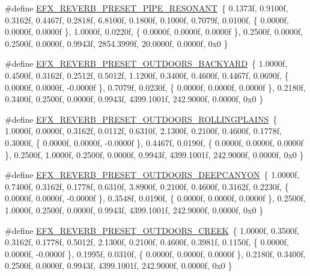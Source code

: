 \begin{DoxyCompactItemize}
\item 
\#define \hyperlink{efx-presets_8h_af6bed932704e2dc1a1631fdd6393a1c5}{E\+F\+X\+\_\+\+R\+E\+V\+E\+R\+B\+\_\+\+P\+R\+E\+S\+E\+T\+\_\+\+P\+I\+P\+E\+\_\+\+R\+E\+S\+O\+N\+A\+NT}~\{ 0.\+1373f, 0.\+9100f, 0.\+3162f, 0.\+4467f, 0.\+2818f, 6.\+8100f, 0.\+1800f, 0.\+1000f, 0.\+7079f, 0.\+0100f, \{ 0.\+0000f, 0.\+0000f, 0.\+0000f \}, 1.\+0000f, 0.\+0220f, \{ 0.\+0000f, 0.\+0000f, 0.\+0000f \}, 0.\+2500f, 0.\+0000f, 0.\+2500f, 0.\+0000f, 0.\+9943f, 2854.\+3999f, 20.\+0000f, 0.\+0000f, 0x0 \}
\item 
\#define \hyperlink{efx-presets_8h_ae4405742339af8a203fa3d6762b4dd0a}{E\+F\+X\+\_\+\+R\+E\+V\+E\+R\+B\+\_\+\+P\+R\+E\+S\+E\+T\+\_\+\+O\+U\+T\+D\+O\+O\+R\+S\+\_\+\+B\+A\+C\+K\+Y\+A\+RD}~\{ 1.\+0000f, 0.\+4500f, 0.\+3162f, 0.\+2512f, 0.\+5012f, 1.\+1200f, 0.\+3400f, 0.\+4600f, 0.\+4467f, 0.\+0690f, \{ 0.\+0000f, 0.\+0000f, -\/0.\+0000f \}, 0.\+7079f, 0.\+0230f, \{ 0.\+0000f, 0.\+0000f, 0.\+0000f \}, 0.\+2180f, 0.\+3400f, 0.\+2500f, 0.\+0000f, 0.\+9943f, 4399.\+1001f, 242.\+9000f, 0.\+0000f, 0x0 \}
\item 
\#define \hyperlink{efx-presets_8h_a86ac4258810f51d3891fe40f771217e6}{E\+F\+X\+\_\+\+R\+E\+V\+E\+R\+B\+\_\+\+P\+R\+E\+S\+E\+T\+\_\+\+O\+U\+T\+D\+O\+O\+R\+S\+\_\+\+R\+O\+L\+L\+I\+N\+G\+P\+L\+A\+I\+NS}~\{ 1.\+0000f, 0.\+0000f, 0.\+3162f, 0.\+0112f, 0.\+6310f, 2.\+1300f, 0.\+2100f, 0.\+4600f, 0.\+1778f, 0.\+3000f, \{ 0.\+0000f, 0.\+0000f, -\/0.\+0000f \}, 0.\+4467f, 0.\+0190f, \{ 0.\+0000f, 0.\+0000f, 0.\+0000f \}, 0.\+2500f, 1.\+0000f, 0.\+2500f, 0.\+0000f, 0.\+9943f, 4399.\+1001f, 242.\+9000f, 0.\+0000f, 0x0 \}
\item 
\#define \hyperlink{efx-presets_8h_a53c7c39adc1ee092ac71b0a5e4a30bb4}{E\+F\+X\+\_\+\+R\+E\+V\+E\+R\+B\+\_\+\+P\+R\+E\+S\+E\+T\+\_\+\+O\+U\+T\+D\+O\+O\+R\+S\+\_\+\+D\+E\+E\+P\+C\+A\+N\+Y\+ON}~\{ 1.\+0000f, 0.\+7400f, 0.\+3162f, 0.\+1778f, 0.\+6310f, 3.\+8900f, 0.\+2100f, 0.\+4600f, 0.\+3162f, 0.\+2230f, \{ 0.\+0000f, 0.\+0000f, -\/0.\+0000f \}, 0.\+3548f, 0.\+0190f, \{ 0.\+0000f, 0.\+0000f, 0.\+0000f \}, 0.\+2500f, 1.\+0000f, 0.\+2500f, 0.\+0000f, 0.\+9943f, 4399.\+1001f, 242.\+9000f, 0.\+0000f, 0x0 \}
\item 
\#define \hyperlink{efx-presets_8h_a0f06675ed7b200e2681fa3a8ca33ea8e}{E\+F\+X\+\_\+\+R\+E\+V\+E\+R\+B\+\_\+\+P\+R\+E\+S\+E\+T\+\_\+\+O\+U\+T\+D\+O\+O\+R\+S\+\_\+\+C\+R\+E\+EK}~\{ 1.\+0000f, 0.\+3500f, 0.\+3162f, 0.\+1778f, 0.\+5012f, 2.\+1300f, 0.\+2100f, 0.\+4600f, 0.\+3981f, 0.\+1150f, \{ 0.\+0000f, 0.\+0000f, -\/0.\+0000f \}, 0.\+1995f, 0.\+0310f, \{ 0.\+0000f, 0.\+0000f, 0.\+0000f \}, 0.\+2180f, 0.\+3400f, 0.\+2500f, 0.\+0000f, 0.\+9943f, 4399.\+1001f, 242.\+9000f, 0.\+0000f, 0x0 \}

\end{DoxyCompactItemize}
